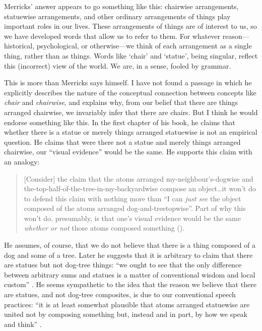 \documentclass[12pt,twoside]{reedfancy}
\begin{document}
\begin{spacing}{1.25}
Merricks' answer appears to go something like this: chairwise
arrangements, statuewise arrangements, and other ordinary arrangements
of things play important roles in our lives.  These arrangements of
things are of interest to us, so we have developed words that allow us
to refer to them.  For whatever reason---historical, psychological, or
otherwise---we think of each arrangement as a single thing, rather
than as things.  Words like `chair' and `statue', being singular,
reflect this (incorrect) view of the world.  We are, in a sense,
fooled by grammar.

This is more than Merricks says himself.  I have not found a passage
in which he explicitly describes the nature of the conceptual
connection between concepts like {\em chair} and {\em chairwise}, and
explains why, from our belief that there are things arranged
chairwise, we invariably infer that there are chairs.  But I think he
would endorse something like this.  In the first chapter of his book,
he claims that whether there is a statue or merely things arranged
statuewise is not an empirical question.  He claims that were there
not a statue and merely things arranged chairwise, our ``visual
evidence'' would be the same.  He supports this claim with an analogy:

\begin{quote}
{[}Consider{]} the claim that the atoms arranged
my-neighbour's-dogwise and the-top-half-of-the-tree-in-my-backyardwise
compose an object\ldots it won't do to defend this claim with nothing
more than ``I can \emph{just see} the object composed of the atoms
arranged dog-and-treetopwise''. Part of why this won't do, presumably,
is that one's visual evidence would be the same \emph{whether or not}
those atoms composed something (\citeyear[8--9]{merricks2001a}).
\end{quote}

He assumes, of course, that we do not believe that there is a thing
composed of a dog and some of a tree.  Later he suggests that it is
arbitrary to claim that there are statues but not dog-tree things:
``we ought to see that the only difference between arbitrary sums and
statues is a matter of conventional wisdom and local custom''
\citeyearpar[75]{merricks2001a}.  He seems sympathetic to the idea
that the reason we believe that there are statues, and not dog-tree
composites, is due to our conventional speech practices: ``it is at
least somewhat plausible that atoms arranged statuewise are united not
by composing something but, instead and in part, by how we speak and
think'' \citeyearpar[121]{merricks2001a}.


\end{spacing}
\end{document}
